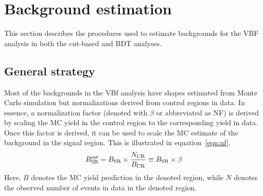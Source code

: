 



\section{Background estimation}
\label{sec:HWWbkg}

This section describes the procedures used to estimate backgrounds for the VBF analysis in both the cut-based and BDT analyses. 

\subsection{General strategy}

Most of the backgrounds in the VBf analysis have shapes estimated from Monte Carlo simulation but normalizations derived from control regions in data. In essence, a normalization factor (denoted with $\beta$ or abbreviated as NF) is derived by scaling the MC yield in the control region to the corresponding yield in data. Once this factor is derived, it can be used to scale the MC estimate of the background in the signal region. This is illustrated in equation~\ref{eqn:nf}.
%
\begin{equation}
B_{\rm SR}^{\rm est} = B_{\rm SR} \times \frac{N_{\rm CR}}{B_{\rm CR}} \equiv B_{\rm SR} \times \beta
\label{eqn:nf}
\end{equation}
%
Here, $B$ denotes the MC yield prediction in the denoted region, while $N$ denotes the observed number of events in data in the denoted region. 

